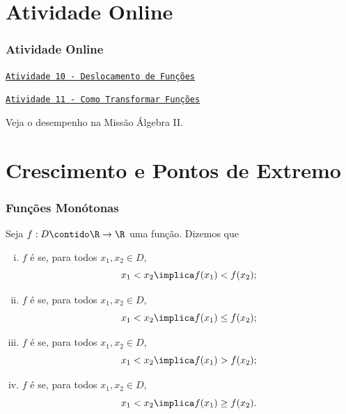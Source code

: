 \documentclass[10pt]{beamer}
\begin{document}
\section{Atividade Online}
\begin{frame}
\frametitle{Atividade Online} 

\href{https://pt.khanacademy.org/math/algebra2/manipulating-functions/shifting-functions/e/shift-functions}
{{\tt Atividade 10 - Deslocamento de Funções}}

\href{https://pt.khanacademy.org/math/algebra2/manipulating-functions/stretching-functions/e/shifting_and_reflecting_functions}
{{\tt Atividade 11 - Como Transformar Funções}}


Veja o desempenho na Missão Álgebra II.


\end{frame}



\section{Crescimento e Pontos de Extremo}
\begin{frame}
\frametitle{Funções Monótonas} 

\begin{definicao}\label{funcmon}
Seja $f: D \contido \R \to \R$ uma função. Dizemos que
\begin{enumerate}[(i)]
	\item $f$ é  se, para todos $x_1, x_2 \in D$,
	$$x_1 < x_2 \implica f(x_1) < f(x_2);$$
	\item $f$ é  se, para todos $x_1, x_2 \in D$,
	$$x_1 < x_2 \implica f(x_1) \leq f(x_2);$$
	\item $f$ é  se, para todos $x_1, x_2 \in D$,
	$$x_1 < x_2 \implica f(x_1) > f(x_2);$$
	\item $f$ é  se, para todos $x_1, x_2 \in D$,
	$$x_1 < x_2 \implica f(x_1) \geq f(x_2).$$%
\end{enumerate}
\end{definicao}

\end{frame}
\end{document}
